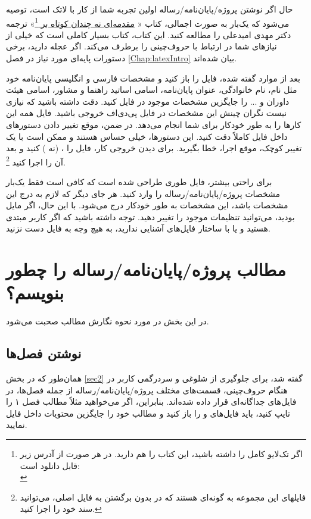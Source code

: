 حال اگر نوشتن پروژه/پایان‌نامه/رساله اولین تجربه شما از کار با لاتک است، توصیه می‌شود که یک‌بار به صورت اجمالی، کتاب «%
\href{http://www.tug.ctan.org/tex-archive/info/lshort/persian/lshort.pdf}{مقدمه‌ای نه چندان کوتاه بر
	\lr{\LaTeXe}}\footnote{اگر تک‌لایو کامل را داشته باشید، این کتاب را هم دارید. در هر صورت از آدرس زیر قابل دانلود است:\\
	}»
ترجمه دکتر مهدی امیدعلی را مطالعه کنید. این کتاب، کتاب بسیار کاملی است که خیلی از نیازهای شما در ارتباط با حروف‌چینی را برطرف می‌کند.
اگر عجله دارید، برخی دستورات پایه‌ای مورد نیاز در فصل \ref{Chap:latexIntro} بیان شده‌اند.


بعد از موارد گفته شده، فایل 
را باز کنید و مشخصات فارسی و انگلیسی پایان‌نامه خود مثل نام، نام خانوادگی، عنوان پایان‌نامه، اسامی اساتید راهنما و مشاور، اسامی هیئت داوران و ... را جایگزین مشخصات موجود در فایل
کنید. دقت داشته باشید که نیازی نیست 
نگران چینش این مشخصات در فایل پی‌دی‌اف خروجی باشید. فایل 
همه این کارها را به طور خودکار برای شما انجام می‌دهد. در ضمن، موقع تغییر دادن دستورهای داخل فایل
کاملاً دقت کنید. این دستورها، خیلی حساس هستند و ممکن است با یک تغییر کوچک، موقع اجرا، خطا بگیرید. برای دیدن خروجی کار، فایل 
را 
، 
(نه 
)
کنید و بعد آن را اجرا کنید%
\footnote{فایلهای این مجموعه به گونه‌ای هستند که در   بدون برگشتن به فایل اصلی، می‌توانید سند خود را اجرا کنید. }.

برای راحتی بیشتر، 
فایل 
طوری طراحی شده است که کافی است فقط  یک‌بار مشخصات پروژه/پایان‌نامه/رساله  را وارد کنید. هر جای دیگر که لازم به درج این مشخصات باشد، این مشخصات به طور خودکار درج می‌شود. با این حال، اگر مایل بودید، می‌توانید تنظیمات موجود را تغییر دهید. توجه داشته باشید که اگر کاربر مبتدی هستید و یا با ساختار فایل‌های  
آشنایی ندارید، به هیچ وجه به فایل 
دست نزنید.
\section[مطالب پروژه را چطور بنویسم؟]
{مطالب پروژه/پایان‌نامه/رساله را چطور بنویسم؟}
در این بخش در مورد نحوه نگارش مطالب صحبت می‌شود.
\subsection{نوشتن فصل‌ها}
همان‌طور که در بخش \ref{sec2} گفته شد، برای جلوگیری از شلوغی و سردرگمی کاربر در هنگام حروف‌چینی، قسمت‌های مختلف پروژه/پایان‌نامه/رساله از جمله فصل‌ها، در فایل‌های جداگانه‌ای قرار داده شده‌اند. 
بنابراین، اگر می‌خواهید مثلاً مطالب فصل ۱ را تایپ کنید، باید فایل‌های 
و
را باز کنید و مطالب خود را جایگزین محتویات داخل فایل 
نمایید. 

